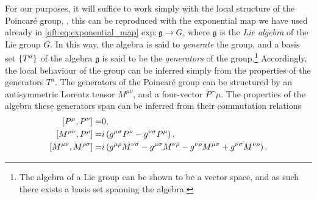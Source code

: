 \documentclass[../main.tex]{subfiles}
\begin{document}
For our purposes, it will suffice to work simply with the local structure of the Poincaré group, , this can be reproduced with the exponential map we have used already in \cref{qft:eq:exponential_map} \(\text{exp} : \mathfrak{g} \to G\), where \(\mathfrak{g}\) is the \emph{Lie algebra} of the Lie group \(G\).
In this way, the algebra is said to \emph{generate} the group, and a basis set \(\left\{T^a\right\}\) of the algebra \(\mathfrak{g}\) is said to be the \emph{generators} of the group.\footnote{The algebra of a Lie group can be shown to be a vector space, and as such there exists a basis set spanning the algebra.}
Accordingly, the local behaviour of the group can be inferred simply from the properties of the generators \(T^a\).
The generators of the Poincaré group can be structured by an antisymmetric Lorentz tensor \(M^{\mu\nu}\), and a four-vector \(P\^\mu\).
The properties of the algebra these generators span can be inferred from their commutation relations
\begin{subequations}
  \begin{align}
    \label{susy:eq:poincare_commutation1}
    \commutator{P\^\mu}{P\^\nu} =             & 0,                                                                                                                                                \\
    \label{susy:eq:poincare_commutation2}
    \commutator{M^{\mu\nu}}{P^\rho} =         & i\pclosed{\metric{\mu}{\sigma} P^\nu - \metric{\nu}{\sigma} P^\mu},                                                                               \\
    \label{susy:eq:poincare_commutation3}
    \commutator{M^{\mu\nu}}{M^{\rho\sigma}} = & i\pclosed{\metric{\mu}{\rho}M^{\nu\sigma} - \metric{\mu}{\sigma}M^{\nu\rho} - \metric{\nu}{\rho}M^{\mu\sigma} + \metric{\nu}{\sigma}M^{\nu\rho}}.
  \end{align}
\end{subequations}
\end{document}
